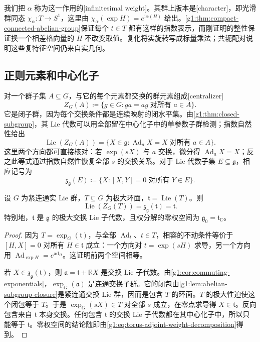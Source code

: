 我们把 \(\alpha\) 称为这一作用的[infinitesimal weight]。其群上版本是[character]，即光滑群同态 \(\chi_\alpha:T\to S^1\)，这里由 \(\chi_\alpha(\exp H)=e^{\mathrm{i}\alpha(H)}\) 给出。\cref{g1:thm:compact-connected-abelian-group}保证每个 \(t\in T\) 都有这样的指数表示，而刚证明的整性保证换一个相差格向量的 \(H\) 不改变取值。复化将实旋转写成标量乘法；共轭配对说明这些复特征空间仍来自实几何。

\subsection{正则元素和中心化子}
\label{g1:subsec:1903:02}
对一个群子集 \(A\subseteq G\)，与它的每个元素都交换的群元素组成[centralizer]
\[
	Z_G(A)\coloneqq\{g\in G:ga=ag\;\text{对所有 }a\in A\}.
\]
它是闭子群，因为每个交换条件都是连续映射的闭水平集。由\cref{g1:thm:closed-subgroup}，其 Lie 代数可以用全部留在中心化子中的单参数子群检测；指数自然性给出
\[
	\operatorname{Lie}(Z_G(A))
	=\{X\in\mathfrak g:\operatorname{Ad}_aX=X\;\text{对所有 }a\in A\}.
\]
这里两个方向都可直接核对：若 \(\exp(sX)\) 与 \(a\) 交换，微分得 \(\operatorname{Ad}_aX=X\)；反之此等式通过指数自然性恢复全部 \(s\) 的交换关系。对于 Lie 代数子集 \(E\subseteq\mathfrak g\)，相应记号为
\[
	\mathfrak z_{\mathfrak g}(E)\coloneqq\{X:[X,Y]=0\;\text{对所有 }Y\in E\}.
\]

\begin{proposition}\label{g1:prop:maximal-torus-lie-centralizer}
	设 \(G\) 为紧连通实 Lie 群，\(T\subseteq G\) 为极大环面，\(\mathfrak t=\operatorname{Lie}(T)\)。则
	\[
		\operatorname{Lie}(Z_G(T))=\mathfrak z_{\mathfrak g}(\mathfrak t)=\mathfrak t.
	\]
	特别地，\(\mathfrak t\) 是 \(\mathfrak g\) 的极大交换 Lie 子代数，且权分解的零权空间为 \(\mathfrak g_0=\mathfrak t_{\mathbb C}\)。
\end{proposition}
\begin{proof}
	因为 \(T=\exp_G(\mathfrak t)\)，与全部 \(\operatorname{Ad}_t\)、\(t\in T\)，相容的不动条件等价于 \([H,X]=0\) 对所有 \(H\in\mathfrak t\) 成立：一个方向对 \(t=\exp(sH)\) 求导，另一个方向用 \(\operatorname{Ad}_{\exp H}=e^{\operatorname{ad}_H}\)。这证明前两个空间相等。

	若 \(X\in\mathfrak z_{\mathfrak g}(\mathfrak t)\)，则 \(\mathfrak a=\mathfrak t+\mathbb RX\) 是交换 Lie 子代数。由\cref{g1:cor:commuting-exponentials}，\(\exp_G(\mathfrak a)\) 是连通交换子群。它的闭包由\cref{g1:lem:abelian-subgroup-closure}是紧连通交换 Lie 群，因而是包含 \(T\) 的环面。\(T\) 的极大性迫使这个闭包等于 \(T\)。于是 \(\exp_G(sX)\in T\) 对全部 \(s\) 成立，在零点求导得 \(X\in\mathfrak t\)。反向包含来自 \(\mathfrak t\) 本身交换。任何包含 \(\mathfrak t\) 的交换 Lie 子代数都在其中心化子中，所以只能等于 \(\mathfrak t\)。零权空间的结论随即由\eqref{g1:eq:torus-adjoint-weight-decomposition}得到。
\end{proof}

